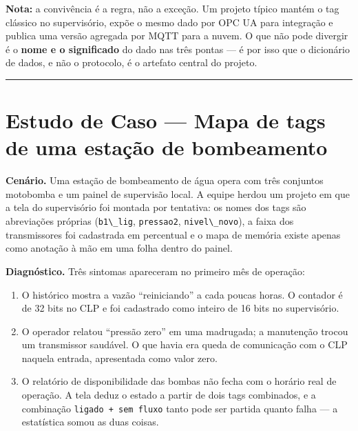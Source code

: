 \begin{caixanota}

\textbf{Nota:} a convivência é a regra, não a exceção. Um projeto típico mantém o tag clássico no
supervisório, expõe o mesmo dado por OPC UA para integração e publica uma versão agregada por
MQTT para a nuvem. O que não pode divergir é o \textbf{nome e o significado} do dado nas três pontas ---
é por isso que o dicionário de dados, e não o protocolo, é o artefato central do projeto.

\end{caixanota}

\begin{center}\rule{0.5\linewidth}{0.5pt}\end{center}

\section{\texorpdfstring{Estudo de Caso --- Mapa de tags de uma estação de bombeamento}{Estudo de Caso  Mapa de tags de uma estação de bombeamento}}\label{estudo-de-caso-mapa-de-tags-de-uma-estauxe7uxe3o-de-bombeamento}

\textbf{Cenário.} Uma estação de bombeamento de água opera com três conjuntos motobomba e um painel de
supervisão local. A equipe herdou um projeto em que a tela do supervisório foi montada por
tentativa: os nomes dos tags são abreviações próprias (\passthrough{\lstinline!b1\_lig!}, \passthrough{\lstinline!pressao2!}, \passthrough{\lstinline!nivel\_novo!}), a faixa
dos transmissores foi cadastrada em percentual e o mapa de memória existe apenas como anotação à mão
em uma folha dentro do painel.

\textbf{Diagnóstico.} Três sintomas apareceram no primeiro mês de operação:

\begin{enumerate}
\def\labelenumi{\arabic{enumi}.}
\tightlist
\item
  O histórico mostra a vazão ``reiniciando'' a cada poucas horas. O contador é de 32 bits no CLP e
  foi cadastrado como inteiro de 16 bits no supervisório.
\item
  O operador relatou ``pressão zero'' em uma madrugada; a manutenção trocou um transmissor saudável.
  O que havia era queda de comunicação com o CLP naquela entrada, apresentada como valor zero.
\item
  O relatório de disponibilidade das bombas não fecha com o horário real de operação. A tela deduz
  o estado a partir de dois tags combinados, e a combinação \passthrough{\lstinline!ligado + sem fluxo!} tanto pode ser
  partida quanto falha --- a estatística somou as duas coisas.
\end{enumerate}


